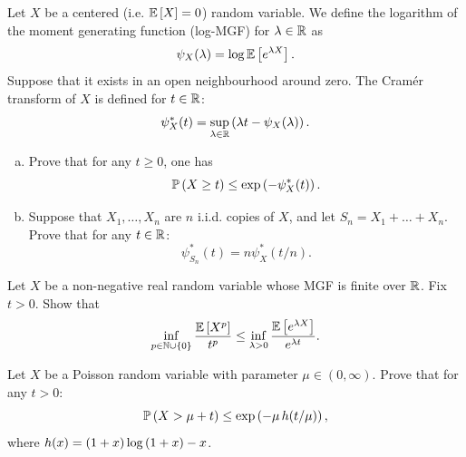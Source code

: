 \begin{myexercise}
    \label{prob:cramer_transform}
    Let $X$ be a centered (i.e. $\mathbb{E}\left[ X \right] = 0$) random variable. We define the logarithm of the moment generating function (log-MGF) for $\lambda \in \mathbb{R}$ as
    \begin{equation*}
        \psi_X(\lambda) = \log\mathbb{E}\left[ e^{\lambda X} \right].
    \end{equation*}
    Suppose that it exists in an open neighbourhood around zero. The Cramér transform of $X$ is defined for $t \in \mathbb{R}$:
    \begin{equation*}
        \psi_X^*(t) = \sup_{\lambda \in \mathbb{R}} \left( \lambda t - \psi_X(\lambda) \right).
    \end{equation*}
    \begin{enumerate}[(a)]
        \item Prove that for any $t \geq 0$, one has
        \begin{equation*}
            \mathbb{P}\left( X \geq t \right) \leq \exp\left( -\psi_X^*(t) \right).
        \end{equation*}
        \item Suppose that $X_1, \ldots, X_n$ are $n$ i.i.d. copies of $X$, and let $S_n = X_1 + \ldots + X_n$. Prove that for any $t \in \mathbb{R}$:
        \begin{equation*}
            \psi_{S_n}^*(t) = n \psi_X^*(t/n).
        \end{equation*}
    \end{enumerate}
\end{myexercise}

\begin{myexercise}
    \label{prob:poly_vs_expo_moments}
    Let $X$ be a non-negative real random variable whose MGF is finite over $\mathbb{R}$. Fix $t > 0$. Show that
    \begin{equation*}
        \inf_{p\in\mathbb{N} \cup \left\{ 0 \right\}} \frac{\mathbb{E}\left[ X^p \right]}{t^p} \leq\inf_{\lambda>0} \frac{\mathbb{E}\left[ e^{\lambda X} \right]}{e^{\lambda t}}.
    \end{equation*}
\end{myexercise}

\begin{myexercise}
    \label{prob:poisson_tail}
    Let $X$ be a Poisson random variable with parameter $\mu \in (0, \infty)$. Prove that for any $t > 0$:
    \begin{equation*}
        \mathbb{P}\left( X > \mu + t \right) \leq \exp\left( -\mu\, h(t / \mu) \right),
    \end{equation*}
    where $h(x) = \left( 1+x \right)\log\left( 1+x \right) - x$.
\end{myexercise}

